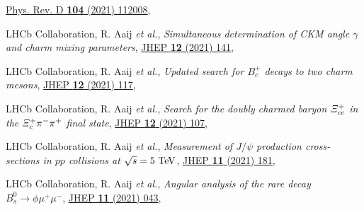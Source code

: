 \begin{cvcontent}
\begin{enumerate}[label={[\arabic*]}, leftmargin=1.5cm]
    \href{https://link.aps.org/doi/10.1103/PhysRevD.104.112008}{Phys. Rev. D \textbf{104} (2021) 112008},
    \item LHCb Collaboration, R. Aaij \emph{et al.}, 
    \emph{Simultaneous determination of CKM angle $\gamma$ and charm mixing parameters},
    \href{https://doi.org/10.1007/JHEP12(2021)141}{JHEP \textbf{12} (2021) 141},
    \sloppy
    \item LHCb Collaboration, R. Aaij \emph{et al.}, 
    \emph{Updated search for $B_c^+$ decays to two charm mesons},
    \href{https://doi.org/10.1007/JHEP12(2021)117}{JHEP \textbf{12} (2021) 117},
    \item LHCb Collaboration, R. Aaij \emph{et al.}, 
    \emph{Search for the doubly charmed baryon $\it{\Xi}_{cc}^{+}$ in the $\it{\Xi}_{c}^{+} \pi^{-} \pi^{+}$ final state},
    \href{https://doi.org/10.1007/JHEP12(2021)107}{JHEP \textbf{12} (2021) 107},
    \item LHCb Collaboration, R. Aaij \emph{et al.}, 
    \emph{Measurement of $J/\psi$ production cross-sections in $pp$ collisions at $\sqrt{s}=5~\rm{TeV}$},
    \href{http://dx.doi.org/10.1007/JHEP11(2021)181}{JHEP \textbf{11} (2021) 181},
    \sloppy
    \item LHCb Collaboration, R. Aaij \emph{et al.}, 
    \emph{Angular analysis of the rare decay $B_s^0 \to \phi \mu^+ \mu^-$},
    \href{http://dx.doi.org/10.1007/JHEP11(2021)043}{JHEP \textbf{11} (2021) 043},
  \end{enumerate}
\end{cvcontent}